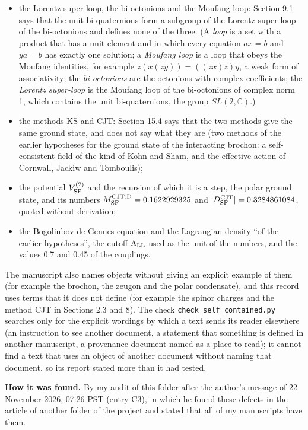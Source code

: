 \documentclass[
  10pt,
]{article}
\providecommand{\tightlist}{%
  \setlength{\itemsep}{0pt}\setlength{\parskip}{0pt}}
\begin{document}
\begin{itemize}
\tightlist
\item
  the Lorentz super-loop, the bi-octonions and the Moufang loop: Section
  9.1 says that the unit bi-quaternions form a subgroup of the Lorentz
  super-loop of the bi-octonions and defines none of the three. (A
  \emph{loop} is a set with a product that has a unit element and in
  which every equation \(ax=b\) and \(ya=b\) has exactly one solution; a
  \emph{Moufang loop} is a loop that obeys the Moufang identities, for
  example \(z(x(zy))=((zx)z)y\), a weak form of associativity; the
  \emph{bi-octonions} are the octonions with complex coefficients; the
  \emph{Lorentz super-loop} is the Moufang loop of the bi-octonions of
  complex norm 1, which contains the unit bi-quaternions, the group
  \(SL(2,\mathbb C)\).)
\item
  the methods KS and CJT: Section 15.4 says that the two methods give
  the same ground state, and does not say what they are (two methods of
  the earlier hypotheses for the ground state of the interacting
  brochon: a self-consistent field of the kind of Kohn and Sham, and the
  effective action of Cornwall, Jackiw and Tomboulis);
\item
  the potential \(V^{(2)}_{\rm SF}\) and the recursion of which it is a
  step, the polar ground state, and its numbers
  \(M^{\rm CJT,D}_{\rm SF}=0.1622929325\) and
  \(\lvert D^{\rm CJT}_{\rm SF}\rvert=0.3284861084\), quoted without
  derivation;
\item
  the Bogoliubov-de Gennes equation and the Lagrangian density ``of the
  earlier hypotheses'', the cutoff \(\Lambda_{\rm LL}\) used as the unit
  of the numbers, and the values 0.7 and 0.45 of the couplings.
\end{itemize}

The manuscript also names objects without giving an explicit example of
them (for example the brochon, the zeugon and the polar condensate), and
this record uses terms that it does not define (for example the spinor
charges and the method CJT in Sections 2.3 and 8). The check
\texttt{check\_self\_contained.py} searches only for the explicit
wordings by which a text sends its reader elsewhere (an instruction to
see another document, a statement that something is defined in another
manuscript, a provenance document named as a place to read); it cannot
find a text that uses an object of another document without naming that
document, so its report stated more than it had tested.

\textbf{How it was found.} By my audit of this folder after the author's
message of 22 November 2026, 07:26 PST (entry C3), in which he found
these defects in the article of another folder of the project and stated
that all of my manuscripts have them.
\end{document}
